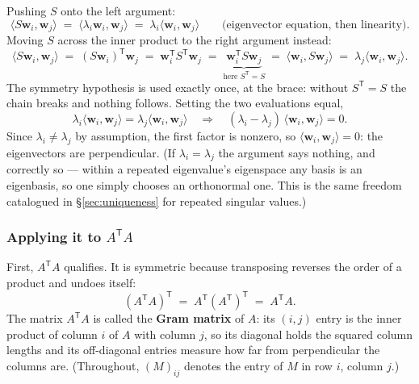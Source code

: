 \documentclass[11pt]{article}
\numberwithin{equation}{section}
\newcommand{\T}{^{\mathsf{T}}}
\newcommand{\ip}[2]{\langle #1, #2 \rangle}
\theoremstyle{plainish}
\begin{document}
Pushing $S$ onto the left argument:
\begin{equation}\ip{S\mathbf{w}_i}{\mathbf{w}_j}
\;=\; \ip{\lambda_i \mathbf{w}_i}{\mathbf{w}_j}
\;=\; \lambda_i \ip{\mathbf{w}_i}{\mathbf{w}_j}
\qquad\text{(eigenvector equation, then linearity).}
\end{equation}
Moving $S$ across the inner product to the right argument instead:
\begin{equation}\ip{S\mathbf{w}_i}{\mathbf{w}_j}
\;=\; (S\mathbf{w}_i)\T \mathbf{w}_j
\;=\; \mathbf{w}_i\T S\T \mathbf{w}_j
\;=\; \underbrace{\mathbf{w}_i\T S \mathbf{w}_j}_{\text{here } S\T = S}
\;=\; \ip{\mathbf{w}_i}{S\mathbf{w}_j}
\;=\; \lambda_j \ip{\mathbf{w}_i}{\mathbf{w}_j}.
\end{equation}
The symmetry hypothesis is used exactly once, at the brace: without $S\T = S$
the chain breaks and nothing follows. Setting the two evaluations equal,
\begin{equation}\lambda_i \ip{\mathbf{w}_i}{\mathbf{w}_j} = \lambda_j \ip{\mathbf{w}_i}{\mathbf{w}_j}
\quad\Longrightarrow\quad
(\lambda_i - \lambda_j)\,\ip{\mathbf{w}_i}{\mathbf{w}_j} = 0 .
\end{equation}
Since $\lambda_i \neq \lambda_j$ by assumption, the first factor is nonzero, so
$\ip{\mathbf{w}_i}{\mathbf{w}_j} = 0$: the eigenvectors are perpendicular. (If
$\lambda_i = \lambda_j$ the argument says nothing, and correctly so --- within a
repeated eigenvalue's eigenspace any basis is an eigenbasis, so one simply
chooses an orthonormal one. This is the same freedom catalogued in
\S\ref{sec:uniqueness} for repeated singular values.)

\subsubsection*{Applying it to \texorpdfstring{$A\T A$}{A transpose A}}

First, $A\T A$ qualifies. It is symmetric because transposing reverses the
order of a product and undoes itself:
\begin{equation}(A\T A)\T \;=\; A\T \left(A\T\right)\T \;=\; A\T A .
\end{equation}
The matrix $A\T A$ is called the \textbf{Gram matrix} of $A$: its $(i,j)$ entry
is the inner product of column $i$ of $A$ with column $j$, so its diagonal
holds the squared column lengths and its off-diagonal entries measure how far
from perpendicular the columns are. (Throughout, $(M)_{ij}$ denotes the entry of
$M$ in row $i$, column $j$.)
\end{document}
